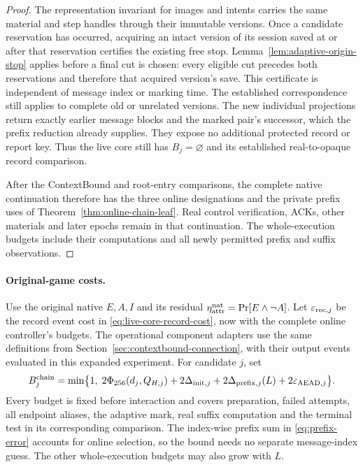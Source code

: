 \begin{proof}
The representation invariant for images and intents carries the same
material and step handles through their immutable versions. Once a candidate
reservation has occurred, acquiring an intact version of its session
saved at or after that reservation certifies the existing free stop.
Lemma~\ref{lem:adaptive-origin-stop} applies before a final cut is chosen:
every eligible cut precedes both reservations and therefore that
acquired version's save. This certificate is independent of message
index or marking time. The established correspondence still applies to
complete old or unrelated versions. The new individual projections
return exactly earlier message blocks and the marked pair's successor,
which the prefix reduction already supplies. They expose no additional
protected record or report key. Thus the live core still has
$B_j=\varnothing$ and its established real-to-opaque record comparison.

After the ContextBound and root-entry comparisons, the complete native
continuation therefore has the three online designations and the
private prefix uses of Theorem~\ref{thm:online-chain-leaf}. Real control
verification, ACKs, other materials and later epochs remain in that
continuation. The whole-execution budgets include their computations
and all newly permitted prefix and suffix observations.
\end{proof}

\paragraph{Original-game costs.}
Use the original native $E,A,I$ and its residual
$\eta_{\rm attr}^{\rm nat}=\Pr[E\wedge\neg A]$. Let
$\varepsilon_{{\rm rec},j}$ be the record event cost in
\eqref{eq:live-core-record-cost}, now with the complete online controller's
budgets. The operational component adapters use the same definitions
from Section~\ref{sec:contextbound-connection}, with their output events
evaluated in this expanded experiment. For candidate $j$, set
\begin{equation}
 B_j^{\rm chain}=\min\bigl\{1,\;
  2\Phi_{256}(d_j,Q_{H,j})+2\Delta_{{\rm init},j}
  +2\Delta_{{\rm prefix},j}(L)+2\varepsilon_{{\rm AEAD},j}\bigr\}.
 \label{eq:native-chain-continuation}
\end{equation}
Every budget is fixed before interaction and covers preparation,
failed attempts, all endpoint aliases, the adaptive mark, real suffix
computation and the terminal test in its corresponding comparison.
The index-wise prefix sum in \eqref{eq:prefix-error} accounts for online
selection, so the bound needs no separate message-index guess. The other
whole-execution budgets may also grow with $L$.

